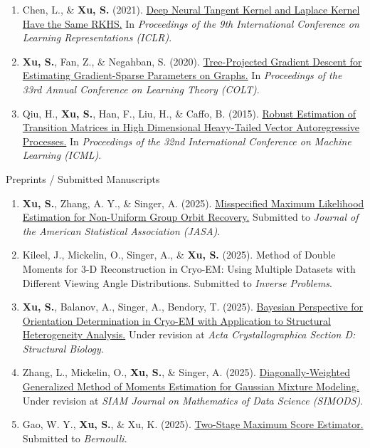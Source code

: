 \documentclass{article}
\begin{document}
\begin{enumerate}
\item Chen, L., \& \textbf{Xu, S.} (2021). \href{https://openreview.net/forum?id=vK9WrZ0QYQ}{Deep Neural Tangent Kernel and Laplace Kernel Have the Same RKHS.} In \emph{Proceedings of the 9th International Conference on Learning Representations (ICLR)}.
\item \textbf{Xu, S.}, Fan, Z., \& Negahban, S. (2020). \href{https://proceedings.mlr.press/v125/xu20a.html}{Tree-Projected Gradient Descent for Estimating Gradient-Sparse Parameters on Graphs.} In \emph{Proceedings of the 33rd Annual Conference on Learning Theory (COLT)}.
\item Qiu, H., \textbf{Xu, S.}, Han, F., Liu, H., \& Caffo, B. (2015). \href{https://proceedings.mlr.press/v37/qiu15.html}{Robust Estimation of Transition Matrices in High Dimensional Heavy-Tailed Vector Autoregressive Processes.} In \emph{Proceedings of the 32nd International
Conference on Machine Learning (ICML)}.
\end{enumerate}



\begin{large}
\noindent Preprints / Submitted Manuscripts
\end{large}

\begin{enumerate}

\item \textbf{Xu, S.}, Zhang, A. Y., \& Singer, A. (2025). \href{https://arxiv.org/abs/2509.22945}{Misspecified Maximum Likelihood Estimation for Non-Uniform Group Orbit Recovery.} Submitted to \emph{Journal of the American Statistical Association (JASA)}.

\item Kileel, J., Mickelin, O., Singer, A., \& \textbf{Xu, S.} (2025). Method of Double Moments for 3-D Reconstruction in Cryo-EM: Using Multiple Datasets with Different Viewing Angle Distributions. Submitted to \emph{Inverse Problems}.

\item \textbf{Xu, S.}, Balanov, A., Singer, A., Bendory, T. (2025). \href{https://arxiv.org/abs/2412.03723}{Bayesian Perspective for Orientation Determination in Cryo-EM with Application to Structural Heterogeneity Analysis.} Under revision at \emph{Acta Crystallographica Section D: Structural Biology}.

\item Zhang, L., Mickelin, O., \textbf{Xu, S.}, \& Singer, A. (2025). \href{https://arxiv.org/abs/2507.20459}{Diagonally-Weighted Generalized Method of Moments Estimation for Gaussian Mixture Modeling.} Under revision at \emph{SIAM Journal on Mathematics of Data Science (SIMODS)}.


\item Gao, W. Y., \textbf{Xu, S.}, \& Xu, K. (2025). \href{https://arxiv.org/abs/2009.02854}{Two-Stage Maximum Score Estimator.} Submitted to \emph{Bernoulli}.
\end{enumerate}
\end{document}
